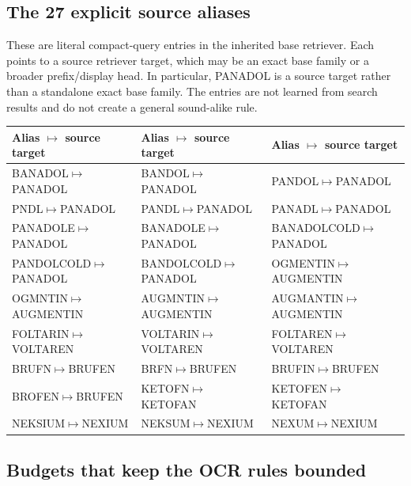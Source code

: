 \documentclass[10pt,a4paper]{article}
\begin{document}
\subsection{The 27 explicit source aliases}

These are literal compact-query entries in the inherited base retriever. Each
points to a source retriever target, which may be an exact base family or a
broader prefix/display head. In particular, PANADOL is a source target rather
than a standalone exact base family. The entries are not learned from search
results and do not create a general sound-alike rule.

{\small
\begin{tabularx}{\textwidth}{@{}Y Y Y@{}}
\toprule
Alias $\mapsto$ source target & Alias $\mapsto$ source target & Alias $\mapsto$ source target \\
\midrule
BANADOL$\mapsto$PANADOL & BANDOL$\mapsto$PANADOL & PANDOL$\mapsto$PANADOL \\
PNDL$\mapsto$PANADOL & PANDL$\mapsto$PANADOL & PANADL$\mapsto$PANADOL \\
PANADOLE$\mapsto$PANADOL & BANADOLE$\mapsto$PANADOL & BANADOLCOLD$\mapsto$PANADOL \\
PANDOLCOLD$\mapsto$PANADOL & BANDOLCOLD$\mapsto$PANADOL & OGMENTIN$\mapsto$AUGMENTIN \\
OGMNTIN$\mapsto$AUGMENTIN & AUGMNTIN$\mapsto$AUGMENTIN & AUGMANTIN$\mapsto$AUGMENTIN \\
FOLTARIN$\mapsto$VOLTAREN & VOLTARIN$\mapsto$VOLTAREN & FOLTAREN$\mapsto$VOLTAREN \\
BRUFN$\mapsto$BRUFEN & BRFN$\mapsto$BRUFEN & BRUFIN$\mapsto$BRUFEN \\
BROFEN$\mapsto$BRUFEN & KETOFN$\mapsto$KETOFAN & KETOFEN$\mapsto$KETOFAN \\
NEKSIUM$\mapsto$NEXIUM & NEKSUM$\mapsto$NEXIUM & NEXUM$\mapsto$NEXIUM \\
\bottomrule
\end{tabularx}
}

\subsection{Budgets that keep the OCR rules bounded}
\end{document}
